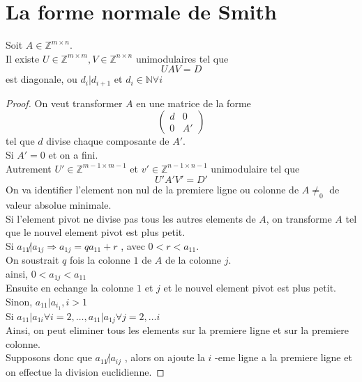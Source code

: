 \documentclass[../main.tex]{subfiles}
\begin{document}
\section{La forme normale de Smith}
\begin{thm}
Soit $A \in \mathbb{Z}^{m\times n}$.\\
Il existe $U \in \mathbb{Z}^{m\times m}, V \in \mathbb{Z}^{n\times n}$ unimodulaires tel que
\[ 
UAV  = D
\]
est diagonale, ou $d_i | d_{i+1} $ et $d_i \in \mathbb{N} \forall i$ 
\end{thm}
\begin{proof}
On veut transformer $A$ en une matrice de la forme
\[ 
\begin{pmatrix}
	d & 0 \\
	0 & A'
\end{pmatrix} 
\]
tel que $d$ divise chaque composante de $A'$.\\
Si $A' =0$ et on a fini.\\
Autrement $U' \in \mathbb{Z}^{m-1\times m-1}$ et $v' \in \mathbb{Z}^{n-1 \times n-1}$ unimodulaire tel que
\[ 
U' A' V' = D'
\]
On va identifier l'element non nul de la premiere ligne ou colonne de $A\neq_0$ de valeur absolue minimale.\\
Si l'element pivot ne divise pas tous les autres elements de $A$, on transforme $A$ tel que le nouvel element pivot est plus petit.\\
Si $ a_{11}\not | a_{1j} \Rightarrow a_{1j} = q a_{11} +r$ , avec $0<r < a_{11}$.\\
On soustrait $q$ fois la colonne $1$ de $A$  de la colonne $j.$\\
ainsi, $0<a_{1j}< a_{11} $\\
Ensuite en echange la colonne $1$ et $j$ et le nouvel element pivot est plus petit.\\
Sinon, $a_{11} | a_{i_1} , i >1$ \\
Si $a_{11}| a_{1i} \forall i =2 , \ldots, a_{11} |a_{1j} \forall j = 2, \ldots i$ \\
Ainsi, on peut eliminer tous les elements sur la premiere ligne et sur la premiere colonne.\\
Supposons donc que $a_{11} \not | a_{ij} $ , alors on ajoute la $i$ -eme ligne a la premiere ligne et on effectue la division euclidienne.
\end{proof}
\end{document}
